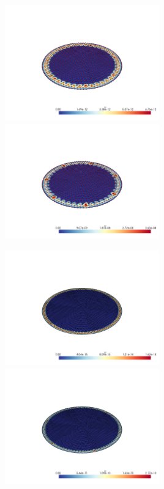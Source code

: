 \documentclass[
  11pt,
]{article}
\let\origfigure\figure
\let\endorigfigure\endfigure
\renewenvironment{figure}[1][2] {
    \expandafter\origfigure\expandafter[H]
} {
    \endorigfigure
}
\begin{document}
\begin{figure}
\caption{Finite element error in the L2 and H1 norms/seminorms, respectively for problem 1 over mesh number 3 using order 13 quadrature.}
\end{figure}

\includegraphics[width=0.5\textwidth,height=\textheight]{../img/mesh3-gauss19-L2.png}
\includegraphics[width=0.5\textwidth,height=\textheight]{../img/mesh3-gauss19-H1.png}

\begin{figure}
\caption{Finite element error in the L2 and H1 norms/seminorms, respectively for problem 1 over mesh number 3 using order 19 quadrature.}
\end{figure}

\includegraphics[width=0.5\textwidth,height=\textheight]{../img/mesh4-gauss02-L2.png}
\includegraphics[width=0.5\textwidth,height=\textheight]{../img/mesh4-gauss02-H1.png}
\end{document}
